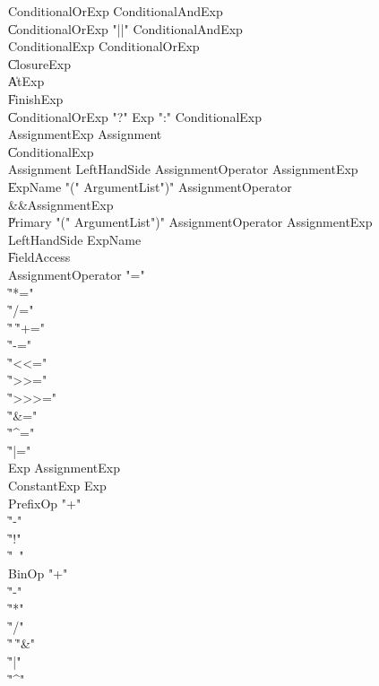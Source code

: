 \begin{grammar}

 ConditionalOrExp  \:   ConditionalAndExp\\
    \|   ConditionalOrExp  \xcd"||"  ConditionalAndExp\\
 ConditionalExp  \:   ConditionalOrExp\\
    \|   ClosureExp\\
    \|   AtExp\\
    \|   FinishExp\\
    \|   ConditionalOrExp  \xcd"?"  Exp  \xcd":"  ConditionalExp\\
 AssignmentExp  \:   Assignment\\
    \|   ConditionalExp\\
 Assignment  \:   LeftHandSide  AssignmentOperator  AssignmentExp\\
    \|   ExpName    \xcd"("  ArgumentList\opt  \xcd")"  AssignmentOperator\\
          &&AssignmentExp\\
    \|   Primary    \xcd"("  ArgumentList\opt  \xcd")"  AssignmentOperator  AssignmentExp\\
 LeftHandSide  \:   ExpName\\
    \|   FieldAccess\\
 AssignmentOperator  \:   \xcd"="\\
    \|   \xcd"*="\\
    \|   \xcd"/="\\
    \|   \xcd"%
    \|   \xcd"+="\\
    \|   \xcd"-="\\
    \|   \xcd"<<="\\
    \|   \xcd">>="\\
    \|   \xcd">>>="\\
    \|   \xcd"&="\\
    \|   \xcd"^="\\
    \|   \xcd"|="\\
 Exp  \:   AssignmentExp\\
 ConstantExp  \:   Exp\\
 PrefixOp  \:   \xcd"+"\\
    \|   \xcd"-"\\
    \|   \xcd"!"\\
    \|   \xcd"~"\\
 BinOp  \:   \xcd"+"\\
    \|   \xcd"-"\\
    \|   \xcd"*"\\
    \|   \xcd"/"\\
    \|   \xcd"%
    \|   \xcd"&"\\
    \|   \xcd"|"\\
    \|   \xcd"^"\\
\end{grammar}

